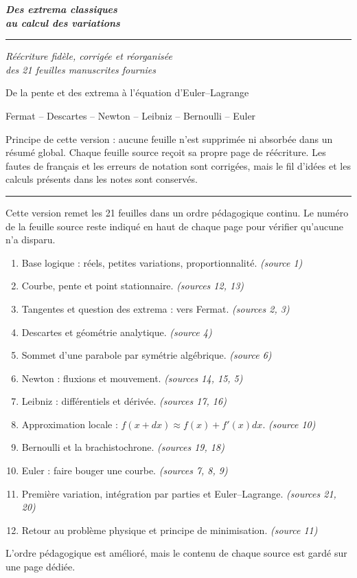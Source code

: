 \documentclass[11pt,a4paper]{article}
\newcommand{\Title}[1]{\begin{center}\vspace*{-2mm}{\fontsize{19}{22}\selectfont\bfseries\itshape #1}\end{center}\vspace{-2mm}\noindent\rule{\linewidth}{0.7pt}\vspace{3mm}}
\newcommand{\Note}[1]{\begin{tcolorbox}[colback=Paper,colframe=InkDark,boxrule=0.45pt,arc=0mm,left=3mm,right=3mm,top=1mm,bottom=1mm]\small #1\end{tcolorbox}}
\newcommand{\newnote}{\clearpage}
\begin{document}
\thispagestyle{empty}
\vspace*{24mm}
\begin{center}
{\fontsize{27}{31}\selectfont\bfseries\itshape Des extrema classiques\\[3mm]au calcul des variations}\par
\vspace{5mm}\rule{150mm}{0.9pt}\vspace{7mm}
{\fontsize{17}{20}\selectfont\itshape Réécriture fidèle, corrigée et réorganisée\\des 21 feuilles manuscrites fournies}\par
\vspace{12mm}
\begin{formule}
\centering\Large De la pente et des extrema à l'équation d'Euler--Lagrange
\end{formule}
\vspace{12mm}
{\large Fermat -- Descartes -- Newton -- Leibniz -- Bernoulli -- Euler}
\end{center}
\vfill
\Note{Principe de cette version : aucune feuille n'est supprimée ni absorbée dans un résumé global. Chaque feuille source reçoit sa propre page de réécriture. Les fautes de français et les erreurs de notation sont corrigées, mais le fil d'idées et les calculs présents dans les notes sont conservés.}
\vspace{10mm}

\newnote
\Title{Plan et ordre de réécriture}
Cette version remet les 21 feuilles dans un ordre pédagogique continu. Le numéro de la feuille source reste indiqué en haut de chaque page pour vérifier qu'aucune n'a disparu.
\begin{enumerate}[leftmargin=8mm,itemsep=2.6pt]
\item Base logique : réels, petites variations, proportionnalité. \textit{(source 1)}
\item Courbe, pente et point stationnaire. \textit{(sources 12, 13)}
\item Tangentes et question des extrema : vers Fermat. \textit{(sources 2, 3)}
\item Descartes et géométrie analytique. \textit{(source 4)}
\item Sommet d'une parabole par symétrie algébrique. \textit{(source 6)}
\item Newton : fluxions et mouvement. \textit{(sources 14, 15, 5)}
\item Leibniz : différentiels et dérivée. \textit{(sources 17, 16)}
\item Approximation locale : $f(x+dx)\approx f(x)+f'(x)dx$. \textit{(source 10)}
\item Bernoulli et la brachistochrone. \textit{(sources 19, 18)}
\item Euler : faire bouger une courbe. \textit{(sources 7, 8, 9)}
\item Première variation, intégration par parties et Euler--Lagrange. \textit{(sources 21, 20)}
\item Retour au problème physique et principe de minimisation. \textit{(source 11)}
\end{enumerate}
\Note{L'ordre pédagogique est amélioré, mais le contenu de chaque source est gardé sur une page dédiée.}
\end{document}
